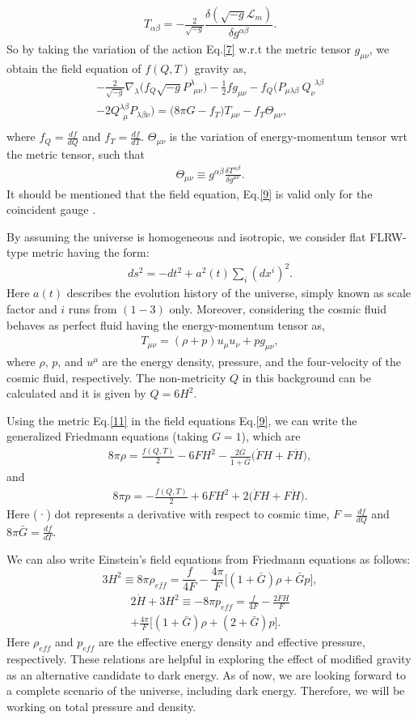 \documentclass[aps,prd,showpacs,nofootinbib,floats,floatfix,preprintnumbers,groupedaddress,twocolumn]{revtex4-1}
\def \m{\mu}
\def \n{\nu}
\def \a{\alpha}
\def \b{\beta}
\def \d{\delta}
\def \l{\lambda}
\def \s{\sqrt}
\def \be{\begin{equation}}
\def \ee{\end{equation}}
\def \ben{\begin{eqnarray}}
\def \een{\end{eqnarray}}
\def \nb{\nabla}
\def \L{\mathcal{L}_m}
\def \r{\rho}
\def \non{\nonumber}
\def \T{\Theta}
\begin{document}
\ben
    T_{\a\b}=-\frac{2}{\s{-g}}\dfrac{\d({\s{-g}\L})}{\d g^{\a\b}}.\label{8}
\een
    So by taking the variation of the action Eq.\eqref{7} w.r.t the metric tensor $g_{\m\n}$, we obtain the field equation of $f(Q,T)$ gravity as,
\ben
    -\frac{2}{\s{-g}}\nb_\l\Big(f_Q\s{-g}P^\l_{~~\m\n}\Big)-\frac{1}{2}f g_{\m\n}-f_Q\Big(P_{\m\l\b}~Q^{~~\l\b}_\n\non\\
    -2 Q^{\l\b}_{~~\m}P_{\l\b\n}\Big)=\big(8\pi G-f_T\big)T_{\m\n}-f_T\T_{\m\n},\non\\
    \label{9}
\een
    where $f_Q=\frac{df}{dQ}$ and $f_T=\frac{df}{dT}$. $\T_{\m\n}$ is the variation of energy-momentum tensor wrt the metric tensor, such that
\ben
    \T_{\m\n}\equiv g^{\a\b}\frac{\d T^{\a\b}}{\d g^{\m\n}}.\label{10}
\een
    It should be mentioned that the field equation, Eq.\eqref{9} is valid only for the coincident gauge \cite{Lavinia}.

    By assuming the universe is homogeneous and isotropic, we consider flat FLRW-type metric having the form:
\ben
    ds^2=-dt^2+a^2(t)\sum_i(dx^{i})^2.\label{11}
\een
    Here $a(t)$ describes the evolution history of the universe, simply known as scale factor and $i$ runs from $(1-3)$ only. Moreover, considering the cosmic fluid behaves as perfect fluid having the energy-momentum tensor as,
\ben
    T_{\m\n}=(\r+p)u_\m u_\n +pg_{\m\n},\label{12}
\een
    where $\r$, $p$, and $u^\m$ are the energy density, pressure, and the four-velocity of the cosmic fluid, respectively. The non-metricity $Q$ in this background can be calculated and it is given by $Q=6H^2$.

    Using the metric Eq.\eqref{11} in the field equations Eq.\eqref{9}, we can write the generalized Friedmann equations (taking $G=1$), which are
\ben
    8\pi \r=\frac{f(Q,T)}{2}-6FH^2-\frac{2\bar{G}}{1+\bar{G}}\big(\dot{F}H+F\dot{H}\big),\label{13}
\een
    and
\ben
    8\pi p=-\frac{f(Q,T)}{2}+6FH^2+2\big(\dot{F}H+F\dot{H}\big)\label{14}.
\een
    Here (·) dot represents a derivative with respect to cosmic time, $F=\frac{df}{dQ}$ and $8\pi\bar{G}=\frac{df}{dT}$.

    We can also write Einstein’s field equations from Friedmann equations as follows:
\be
    3H^2\equiv 8\pi \r_{eff}=\frac{f}{4F}-\frac{4\pi}{F}\big[(1+\bar{G})\r+\bar{G}p\big],\label{15}
\ee
\ben
    2\dot{H}+3H^2\equiv -8\pi p_{eff}=\frac{f}{4F}-\frac{2\dot{F}H}{F}\non\\
    +\frac{4\pi}{F}\big[(1+\bar{G})\r+(2+\bar{G})p\big]\label{16}.
\een
    Here $\r_{eff}$ and $p_{eff}$ are the effective energy density and effective pressure, respectively. These relations are helpful in exploring the effect of modified gravity as an alternative candidate to dark energy. As of now, we are looking forward to a complete scenario of the universe, including dark energy. Therefore, we will be working on total pressure and density.
\end{document}

